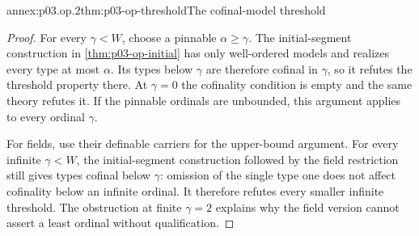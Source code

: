 \begin{annexitem}{annex:p03.op.2}{thm:p03-op-threshold}{The cofinal-model threshold}
\begin{proof}
For every \(\gamma<W\), choose a pinnable \(\alpha\geq\gamma\).
The initial-segment construction in \cref{thm:p03-op-initial}
has only well-ordered models and realizes every type at most
\(\alpha\). Its types below \(\gamma\) are therefore cofinal
in \(\gamma\), so it refutes the threshold property there.
At \(\gamma=0\) the cofinality condition is empty and the same
theory refutes it. If the pinnable ordinals are unbounded,
this argument applies to every ordinal \(\gamma\).

For fields, use their definable carriers for the upper-bound
argument. For every infinite \(\gamma<W\), the
initial-segment construction followed by the field restriction
still gives types cofinal below \(\gamma\): omission of the
single type one does not affect cofinality below an infinite
ordinal. It therefore refutes every smaller infinite threshold.
The obstruction at finite \(\gamma=2\) explains why the
field version cannot assert a least ordinal without qualification.
\end{proof}
\end{annexitem}

